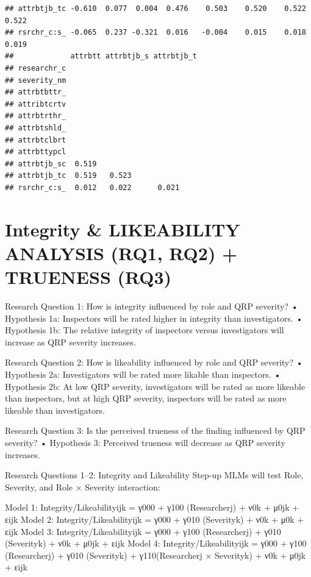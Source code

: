 \documentclass[
]{article}
\begin{document}
\begin{verbatim}
## attrbtjb_tc -0.610  0.077  0.004  0.476    0.503    0.520    0.522    0.522  
## rsrchr_c:s_ -0.065  0.237 -0.321  0.016   -0.004    0.015    0.018    0.019  
##             attrbtt attrbtjb_s attrbtjb_t
## researchr_c                              
## severity_nm                              
## attrbtbttr_                              
## attribtcrtv                              
## attrbtrthr_                              
## attrbtshld_                              
## attrbtclbrt                              
## attrbttypcl                              
## attrbtjb_sc  0.519                       
## attrbtjb_tc  0.519   0.523               
## rsrchr_c:s_  0.012   0.022      0.021
\end{verbatim}

\section{Integrity \& LIKEABILITY ANALYSIS (RQ1, RQ2) + TRUENESS
(RQ3)}\label{integrity-likeability-analysis-rq1-rq2-trueness-rq3}

Research Question 1: How is integrity influenced by role and QRP
severity? • Hypothesis 1a: Inspectors will be rated higher in integrity
than investigators. • Hypothesis 1b: The relative integrity of
inspectors versus investigators will increase as QRP severity increases.

Research Question 2: How is likeability influenced by role and QRP
severity? • Hypothesis 2a: Investigators will be rated more likable than
inspectors. • Hypothesis 2b: At low QRP severity, investigators will be
rated as more likeable than inspectors, but at high QRP severity,
inspectors will be rated as more likeable than investigators.

Research Question 3: Is the perceived trueness of the finding influenced
by QRP severity? • Hypothesis 3: Perceived trueness will decrease as QRP
severity increases.

Research Questions 1--2: Integrity and Likeability Step-up MLMs will
test Role, Severity, and Role × Severity interaction:

Model 1: Integrity/Likeabilityijk = γ000 + γ100 (Researcherj) + ν0k +
μ0jk + εijk Model 2: Integrity/Likeabilityijk = γ000 + γ010 (Severityk)
+ ν0k + μ0k + εijk Model 3: Integrity/Likeabilityijk = γ000 + γ100
(Researcherj) + γ010 (Severityk) + ν0k + μ0jk + εijk Model 4:
Integrity/Likeabilityijk = γ000 + γ100 (Researcherj) + γ010 (Severityk)
+ γ110(Researcherj × Severityk) + ν0k + μ0jk + εijk
\end{document}

